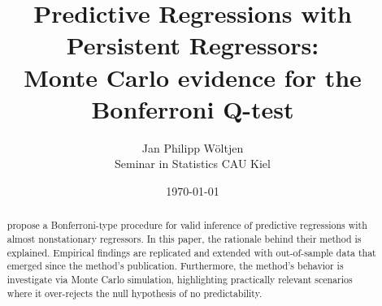 \documentclass[11pt, a4paper]{article}
\title{Predictive Regressions with Persistent Regressors:\\ Monte Carlo evidence for the Bonferroni Q-test}
\author{Jan Philipp Wöltjen  \\
	Seminar in Statistics CAU Kiel  \\
	}
\date{\today}
\begin{document}
\maketitle


\begin{abstract}
\citet{campbell2006efficient} propose a Bonferroni-type procedure for valid inference of predictive regressions with almost nonstationary regressors. In this paper, the rationale behind their method is explained. Empirical findings are replicated and extended with out-of-sample data that emerged since the method's publication. Furthermore, the method's behavior is investigate via Monte Carlo simulation, highlighting practically relevant scenarios where it over-rejects the null hypothesis of no predictability. 
\end{abstract}
\end{document}
